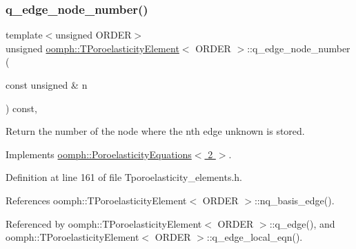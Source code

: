 \mbox{\label{classoomph_1_1TPoroelasticityElement_acfccb491755f774ef5fa4803fad53abe}} 
\subsubsection{\texorpdfstring{q\+\_\+edge\+\_\+node\+\_\+number()}{q\_edge\_node\_number()}}
{\footnotesize\ttfamily template$<$unsigned O\+R\+D\+ER$>$ \\
unsigned \hyperlink{classoomph_1_1TPoroelasticityElement}{oomph\+::\+T\+Poroelasticity\+Element}$<$ O\+R\+D\+ER $>$\+::q\+\_\+edge\+\_\+node\+\_\+number (\begin{DoxyParamCaption}\item[{const unsigned \&}]{n }\end{DoxyParamCaption}) const\hspace{0.3cm}{\ttfamily [inline]}, {\ttfamily [virtual]}}



Return the number of the node where the nth edge unknown is stored. 



Implements \hyperlink{classoomph_1_1PoroelasticityEquations_a34a28eb238815fe3475c09ed256393c4}{oomph\+::\+Poroelasticity\+Equations$<$ 2 $>$}.



Definition at line 161 of file Tporoelasticity\+\_\+elements.\+h.



References oomph\+::\+T\+Poroelasticity\+Element$<$ O\+R\+D\+E\+R $>$\+::nq\+\_\+basis\+\_\+edge().



Referenced by oomph\+::\+T\+Poroelasticity\+Element$<$ O\+R\+D\+E\+R $>$\+::q\+\_\+edge(), and oomph\+::\+T\+Poroelasticity\+Element$<$ O\+R\+D\+E\+R $>$\+::q\+\_\+edge\+\_\+local\+\_\+eqn().

\mbox{\label{classoomph_1_1TPoroelasticityElement_aea5341bc3d2b89c13a6907b1f10feffc}} 
